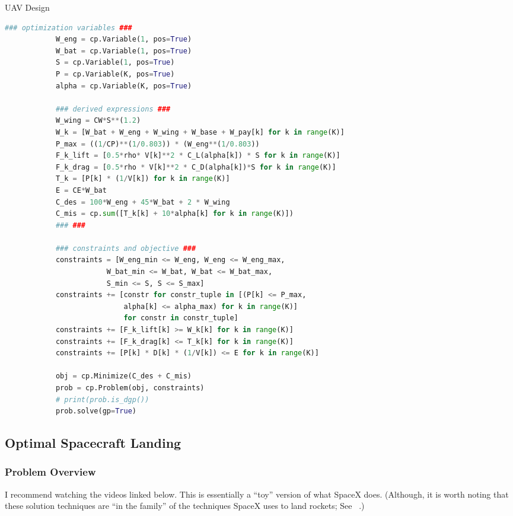 \documentclass[12pt,reqno]{article}
\theoremstyle{definition}
\numberwithin{equation}{section}
\begin{document}
    \begin{algorithm}[H]
        \caption{UAV Design}
        \centering
            \begin{lstlisting}[language=Python]
            ### optimization variables ###
            W_eng = cp.Variable(1, pos=True)
            W_bat = cp.Variable(1, pos=True)
            S = cp.Variable(1, pos=True)
            P = cp.Variable(K, pos=True)
            alpha = cp.Variable(K, pos=True)
            
            ### derived expressions ###
            W_wing = CW*S**(1.2)
            W_k = [W_bat + W_eng + W_wing + W_base + W_pay[k] for k in range(K)]
            P_max = ((1/CP)**(1/0.803)) * (W_eng**(1/0.803))
            F_k_lift = [0.5*rho* V[k]**2 * C_L(alpha[k]) * S for k in range(K)]
            F_k_drag = [0.5*rho * V[k]**2 * C_D(alpha[k])*S for k in range(K)]
            T_k = [P[k] * (1/V[k]) for k in range(K)]
            E = CE*W_bat
            C_des = 100*W_eng + 45*W_bat + 2 * W_wing
            C_mis = cp.sum([T_k[k] + 10*alpha[k] for k in range(K)])
            ### ###
            
            ### constraints and objective ###
            constraints = [W_eng_min <= W_eng, W_eng <= W_eng_max,
                        W_bat_min <= W_bat, W_bat <= W_bat_max,
                        S_min <= S, S <= S_max]
            constraints += [constr for constr_tuple in [(P[k] <= P_max,
                            alpha[k] <= alpha_max) for k in range(K)]
                            for constr in constr_tuple]
            constraints += [F_k_lift[k] >= W_k[k] for k in range(K)]
            constraints += [F_k_drag[k] <= T_k[k] for k in range(K)]
            constraints += [P[k] * D[k] * (1/V[k]) <= E for k in range(K)]
            
            obj = cp.Minimize(C_des + C_mis)
            prob = cp.Problem(obj, constraints)
            # print(prob.is_dgp())
            prob.solve(gp=True)
            \end{lstlisting}
        \label{alg:uav_code}
    \end{algorithm}

\newpage
\subsection{Optimal Spacecraft Landing}

\subsubsection*{Problem Overview}
I recommend watching the videos linked below. This is essentially a ``toy'' version of what SpaceX
does. (Although, it is worth noting that these solution techniques are ``in the family'' of the techniques SpaceX
uses to land rockets; See ~\cite{Stanford-spaceX}.)
\end{document}
